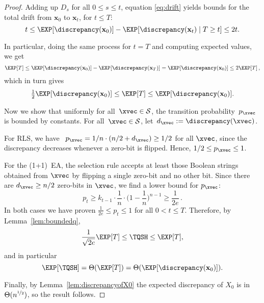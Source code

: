 \begin{proof}
%

Adding up $D_s$ for all $0 \le s \le t$, equation \eqref{eq:drift} yields bounds for the total drift from $\mathbf{x}_0$ to $\mathbf{x}_t$, for $t\leq T$:
\[
t \le \EXP[\discrepancy(\mathbf{x}_0)]-\EXP[\discrepancy(\mathbf{x}_t)\mid T \geq t] \le 2t. 
\]

In particular, doing the same process for $t=T$ and computing expected values, we get
\[
\EXP[T] \le \EXP[\discrepancy(\mathbf{x}_0)]-\EXP[\discrepancy(\mathbf{x}_T)]=\EXP[\discrepancy(\mathbf{x}_0)]\le 2 \EXP[T]\, , 
\]
which in turn gives 
\[
\tfrac{1}{2}\EXP[\discrepancy(\mathbf{x}_0)]\le \EXP[T] \le \EXP[\discrepancy(\mathbf{x}_0)].
\]

Now we show that uniformly for all~$\xvec\in\mathcal{S}$, the transition probability~$p_{\xvec}$ is bounded by constants. For all~$\xvec\in\mathcal{S}$, let~$d_{\xvec}:=\discrepancy(\xvec)$.

For RLS, we have ~$p_{\xvec} = 1/n \cdot (n/2 + d_{\xvec}) \geq 1/2$ for all $\xvec$, since the discrepancy decreases whenever a zero-bit is flipped. Hence, $1/2 \le p_{\xvec} \le 1$.

For the (1+1)~EA, the selection rule accepts at least those Boolean strings obtained from $\xvec$ by flipping a single zero-bit and no other bit. Since there are $d_{\xvec} \ge n/2$ zero-bits in $\xvec$, we find a lower bound for $p_{\xvec}$:
\[
p_t \ge k_{t-1}\cdot\frac{1}{n}\cdot\Big(1-\frac{1}{n}\Big)^{n-1}\ge \frac{1}{2e}\,.
\]
In both cases we have proven $\frac{1}{2e} \le p_t \le 1$ for all $0 < t \leq T$. Therefore, by Lemma~\ref{lem:boundedq},
\[
\frac{1}{\sqrt{2e}}\EXP[T]\le \TQSH \le \EXP[T],
\]
and in particular
\[
\EXP[\TQSH] = \Theta(\EXP[T]) = \Theta(\EXP[\discrepancy(\mathbf{x}_0)]).
\]

Finally, by Lemma~\ref{lem:discrepancyofX0} the expected discrepancy of $X_0$ is in $\Theta(n^{\nicefrac{1}{2}})$, so the result follows.
\end{proof}

